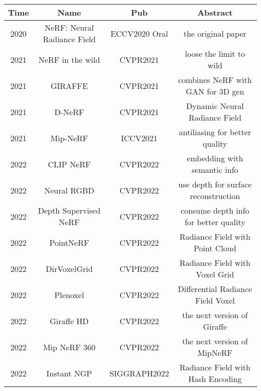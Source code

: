 \begin{tabular}{|c|c|c|c|}
    \hline
    Time & Name & Pub & Abstract \\
    \hline 
    2020 & 
        NeRF: Neural Radiance Field \cite{mildenhallNeRFRepresentingScenes2020} 
    & ECCV2020 Oral & the original paper \\
    \hline 
    2021 & 
        NeRF in the wild \cite{martin-bruallaNeRFWildNeural2021} 
    & CVPR2021 & loose the limit to wild \\
    \hline 
    2021 & 
        GIRAFFE\cite{niemeyerGIRAFFERepresentingScenes2021}
    & CVPR2021 & combines NeRF with GAN for 3D gen\\
    \hline 
    2021 &
        D-NeRF \cite{pumarolaDNeRFNeuralRadiance2021}
    & CVPR2021 & Dynamic Neural Radiance Field \\
    \hline 
    2021 & 
        Mip-NeRF\cite{barronMipNeRFMultiscaleRepresentation2021}
    & ICCV2021 & antiliasing for better quality \\
    \hline 
    2022 & 
        CLIP NeRF\cite{wangCLIPNeRFTextandImageDriven2022}
    & CVPR2022 & embedding with semantic info \\
    \hline 
    2022 &
        Neural RGBD\cite{azinovicNeuralRGBDSurface2021}
    & CVPR2022 & use depth for surface reconstruction \\
    \hline 
    2022 &
        Depth Supervised NeRF \cite{dengDepthsupervisedNeRFFewer2022}
    & CVPR2022 & consume depth info for better quality \\ 
    \hline 
    2022 &
        PointNeRF\cite{xuPointNeRFPointbasedNeurala}
    & CVPR2022 & Radiance Field with Point Cloud \\
    \hline 
    2022 &
        DirVoxelGrid\cite{sunDirectVoxelGrid2022} 
    & CVPR2022 & Radiance Field with Voxel Grid \\
    2022 &
        Plenoxel \cite{yuPlenoxelsRadianceFields2021}
    & CVPR2022 & Differential Radiance Field Voxel \\ 
    \hline
    2022 & 
        Giraffe HD\cite{xueGIRAFFEHDHighResolution2022} 
    & CVPR2022 & the next version of Giraffe\cite{niemeyerGIRAFFERepresentingScenes2021} \\
    \hline 
    2022 &
        Mip NeRF 360\cite{barronMipNeRF360Unbounded2022}
    & CVPR2022 & the next version of MipNeRF\cite{barronMipNeRFMultiscaleRepresentation2021} \\ 
    \hline 
    2022 & 
        Instant NGP \cite{mullerInstantNeuralGraphics2022} 
    & SIGGRAPH2022 & Radiance Field with Hash Encoding \\ 
    \hline 

\end{tabular}
